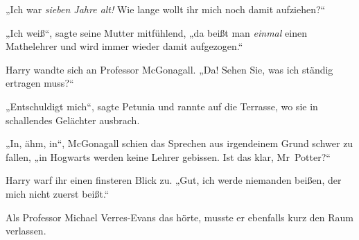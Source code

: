 „Ich war \emph{sieben Jahre alt!} Wie lange wollt ihr mich noch damit aufziehen?“

„Ich weiß“, sagte seine Mutter mitfühlend, „da beißt man \emph{einmal} einen Mathelehrer und wird immer wieder damit aufgezogen.“

Harry wandte sich an Professor McGonagall.
„Da! Sehen Sie, was ich ständig ertragen muss?“

„Entschuldigt mich“, sagte Petunia und rannte auf die Terrasse, wo sie in schallendes Gelächter ausbrach.

„In, ähm, in“, McGonagall schien das Sprechen aus irgendeinem Grund schwer zu fallen, „in Hogwarts werden keine Lehrer gebissen. Ist das klar, Mr~Potter?“

Harry warf ihr einen finsteren Blick zu.
„Gut, ich werde niemanden beißen, der mich nicht zuerst beißt.“

Als Professor Michael Verres-Evans das hörte, musste er ebenfalls kurz den Raum verlassen.

